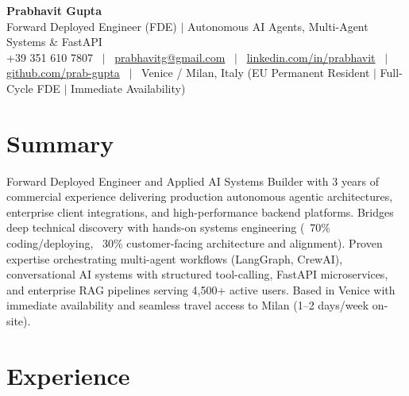 \documentclass[a4paper,10pt]{article}
\begin{document}
\begin{minipage}[c]{0.80\textwidth}
  {\Huge\bfseries Prabhavit Gupta}\\[3pt]
  {\color{accent}\large Forward Deployed Engineer (FDE) $\vert$ Autonomous AI Agents, Multi-Agent Systems \& FastAPI}\\[6pt]
  {\footnotesize +39 351 610 7807 ~$\vert$~
  \href{mailto:prabhavitg@gmail.com}{prabhavitg@gmail.com} ~$\vert$~
  \href{https://www.linkedin.com/in/prabhavit/}{linkedin.com/in/prabhavit} ~$\vert$~
  \href{https://github.com/prab-gupta}{github.com/prab-gupta} ~$\vert$~
  Venice / Milan, Italy (EU Permanent Resident $\vert$ Full-Cycle FDE $\vert$ Immediate Availability)}
\end{minipage}\hfill

\section{Summary}
Forward Deployed Engineer and Applied AI Systems Builder with 3 years of commercial experience delivering production autonomous agentic architectures, enterprise client integrations, and high-performance backend platforms. Bridges deep technical discovery with hands-on systems engineering (~70\% coding/deploying, ~30\% customer-facing architecture and alignment). Proven expertise orchestrating multi-agent workflows (LangGraph, CrewAI), conversational AI systems with structured tool-calling, FastAPI microservices, and enterprise RAG pipelines serving 4,500+ active users. Based in Venice with immediate availability and seamless travel access to Milan (1--2 days/week on-site).

\section{Experience}
\end{document}
